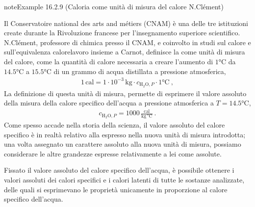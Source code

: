 \documentclass[letterpaper,10pt,italian]{jupyterBook}
\begin{document}
\begin{sphinxadmonition}{note}{Example 16.2.9 (Caloria come unità di misura del calore \sphinxhyphen{} N.Clément)}



\sphinxAtStartPar
Il Conservatoire national des arts and métiers (CNAM) è una delle tre istituzioni create durante la Rivoluzione francese per l’insegnamento superiore scientifico. N.Clément, professore di chimica presso il CNAM, e coinvolto in studi sul calore e sull’equivalenza calore\sphinxhyphen{}lavoro insieme a Carnot, definisce la  come unità di misura del calore, come la quantità di calore necessaria a creare l’aumento di \(1 \text{°C}\) da \(14.5 \text{°C}\) a \(15.5 \text{°C}\) di un grammo di acqua distillata a pressione atmosferica,
\begin{equation*}
\begin{split}1 \, \text{cal} = 1 \cdot 10^{-3} \, \text{kg} \cdot c_{\text{H$_2$O},P} \cdot 1 \text{°C} \ ,\end{split}
\end{equation*}
\sphinxAtStartPar
La definizione di questa unità di misura, permette di esprimere il valore assoluto della misura della calore specifico dell’acqua a pressione atmosferica a \(T = 14.5 \text{°C}\),
\begin{equation*}
\begin{split}c_{\text{H$_2$O},P} = 1000 \, \frac{\text{cal}}{\text{kg} \, \text{°C}} \ .\end{split}
\end{equation*}
\sphinxAtStartPar
{} Come spesso accade nella storia della scienza, il valore assoluto del calore specifico è in realtà relativo alla \sphinxhyphen{} espresso nella \sphinxhyphen{} nuova unità di misura introdotta; una volta assegnato un carattere assoluto alla nuova unità di misura, possiamo considerare le altre grandezze espresse relativamente a lei come assolute.

\sphinxAtStartPar
{} Fissato il valore assoluto del calore specifico dell’acqua, è possibile ottenere i valori assoluti dei calori specifici e i calori latenti di tutte le sostanze analizzate, delle quali si esprimevano le proprietà unicamente in proporzione al calore specifico dell’acqua.
\end{sphinxadmonition}
\end{document}
